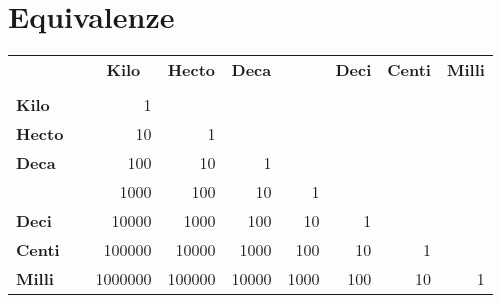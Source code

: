 \section{Equivalenze}
{\centering{}
	\begin{tabular}{llrrrrrrr}
		\toprule	
			&&\multicolumn{1}{c}{\textbf{Kilo}} &\multicolumn{1}{c}{\textbf{Hecto}} & \multicolumn{1}{c}{\textbf{Deca}} &  & \multicolumn{1}{c}{\textbf{Deci}} & \multicolumn{1}{c}{\textbf{Centi}} & \multicolumn{1}{c}{\textbf{Milli}} \\ 
			&&\multicolumn{1}{c}{\textbf{\si{\kilo}}} & \multicolumn{1}{c}{\textbf{\si{\hecto}}} & \multicolumn{1}{c}{\textbf{\si{\deca}}} &  & \multicolumn{1}{c}{\textbf{\si{\deci}}} & \multicolumn{1}{c}{\textbf{\si{\centi}}} & \multicolumn{1}{c}{\textbf{\si{\milli}}} \\ 
			\midrule
		\textbf{Kilo}&\si{\kilo}	&\num{1}  &  &  &  &  &  &  \\ 
		\textbf{Hecto}&\si{\hecto}	& \num{10} &\num{1}  &  &  &  &  &  \\ 
		\textbf{Deca}&\si{\deca}	& \num{100} & \num{10} &\num{1}  &  &  &  &  \\ 
	&	& \num{1000} & \num{100} &\num{10}  &\num{1}  &  &  &  \\ 
		\textbf{Deci}&\si{\deci}	& \num{10000} &\num{1000}  &\num{100}  &\num{10}  & \num{1} &  &  \\ 
		\textbf{Centi}&\si{\centi}	&\num{100000}  & \num{10000} & \num{1000} & \num{100} &\num{10}  & \num{1} &  \\ 
		\textbf{Milli}&\si{\milli}	&\num{1000000}  &\num{100000}  & \num{10000} &\num{1000}  & \num{100} & \num{10} & \num{1} \\ 
		\bottomrule
	\end{tabular}\par}

